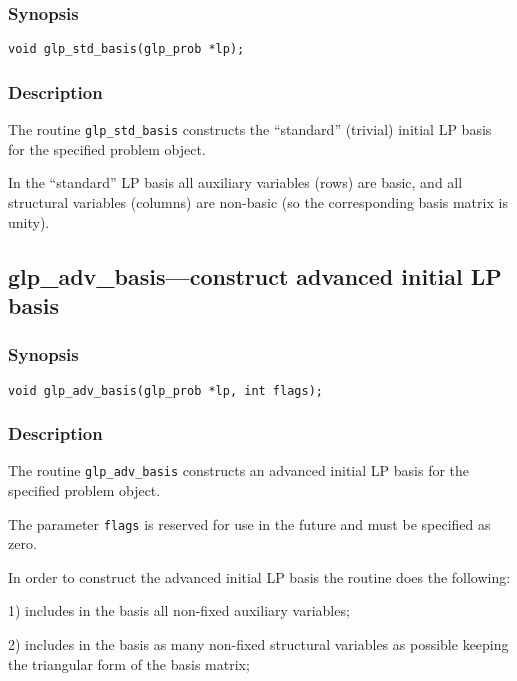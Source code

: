 \subsubsection*{Synopsis}

\begin{verbatim}
void glp_std_basis(glp_prob *lp);
\end{verbatim}

\subsubsection*{Description}

The routine \verb|glp_std_basis| constructs the ``standard'' (trivial)
initial LP basis for the specified problem object.

In the ``standard'' LP basis all auxiliary variables (rows) are basic,
and all structural variables (columns) are non-basic (so the
corresponding basis matrix is unity).

\newpage

\subsection{glp\_adv\_basis---construct advanced initial LP basis}

\subsubsection*{Synopsis}

\begin{verbatim}
void glp_adv_basis(glp_prob *lp, int flags);
\end{verbatim}

\subsubsection*{Description}

The routine \verb|glp_adv_basis| constructs an advanced initial LP
basis for the specified problem object.

The parameter \verb|flags| is reserved for use in the future and must
be specified as zero.

In order to construct the advanced initial LP basis the routine does
the following:

1) includes in the basis all non-fixed auxiliary variables;

2) includes in the basis as many non-fixed structural variables as
possible keeping the triangular form of the basis matrix;

